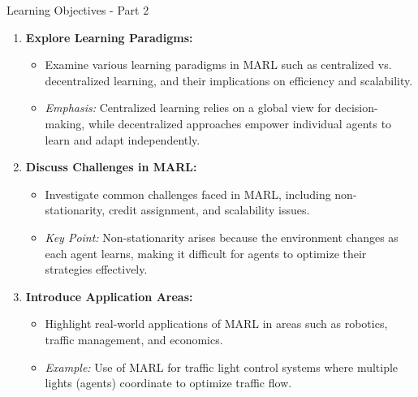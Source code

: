\documentclass[aspectratio=169]{beamer}
\begin{document}
\begin{frame}[fragile]{Learning Objectives - Part 2}
    \begin{enumerate}[resume]
        \item \textbf{Explore Learning Paradigms:} 
        \begin{itemize}
            \item Examine various learning paradigms in MARL such as centralized vs. decentralized learning, and their implications on efficiency and scalability. 
            \item \textit{Emphasis:} Centralized learning relies on a global view for decision-making, while decentralized approaches empower individual agents to learn and adapt independently.
        \end{itemize}
        
        \item \textbf{Discuss Challenges in MARL:} 
        \begin{itemize}
            \item Investigate common challenges faced in MARL, including non-stationarity, credit assignment, and scalability issues.
            \item \textit{Key Point:} Non-stationarity arises because the environment changes as each agent learns, making it difficult for agents to optimize their strategies effectively.
        \end{itemize}
        
        \item \textbf{Introduce Application Areas:}
        \begin{itemize}
            \item Highlight real-world applications of MARL in areas such as robotics, traffic management, and economics.
            \item \textit{Example:} Use of MARL for traffic light control systems where multiple lights (agents) coordinate to optimize traffic flow.
        \end{itemize}
    \end{enumerate}
\end{frame}
\end{document}
